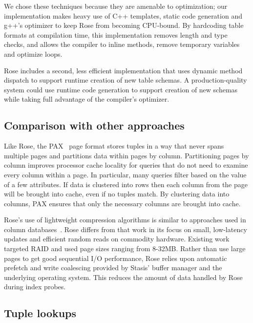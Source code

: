 \documentclass{vldb}
\newcommand{\rows}{Rose\xspace}
\newcommand{\rowss}{Rose's\xspace}
\begin{document}
We chose these techniques because they are amenable to optimization;
our implementation makes heavy use of C++ templates, static code
generation and g++'s optimizer to keep \rows from becoming
CPU-bound.  By hardcoding table formats at compilation time, this
implementation removes length and type checks, and allows the compiler
to inline methods, remove temporary variables and optimize loops.

\rows includes a second, less efficient implementation that uses
dynamic method dispatch to support runtime creation of new table
schemas.  A production-quality system could use runtime code
generation to support creation of new schemas while taking full
advantage of the compiler's optimizer.

\subsection{Comparison with other approaches}

Like \rows, the PAX~\cite{PAX} page format stores tuples in a way that never
spans multiple pages and partitions data within pages by column.
Partitioning pages by column
improves processor cache locality for queries that do not need to
examine every column within a page.  In particular, many queries
filter based on the value of a few attributes.  If data is clustered
into rows then each column from the page will be brought into cache,
even if no tuples match.  By clustering data into columns, PAX ensures
that only the necessary columns are brought into cache.

\rowss use of lightweight compression algorithms is similar to
approaches used in column databases~\cite{pfor}.  \rows differs from
that work in its focus on small, low-latency updates and efficient random reads on commodity
hardware.  Existing work targeted RAID and used page sizes ranging from 8-32MB.  Rather
than use large pages to get good sequential I/O performance, \rows
relies upon automatic prefetch and write coalescing
provided by Stasis' buffer manager and the underlying operating
system.  This reduces the amount of data handled by \rows during index
probes.

\subsection{Tuple lookups}
\end{document}
